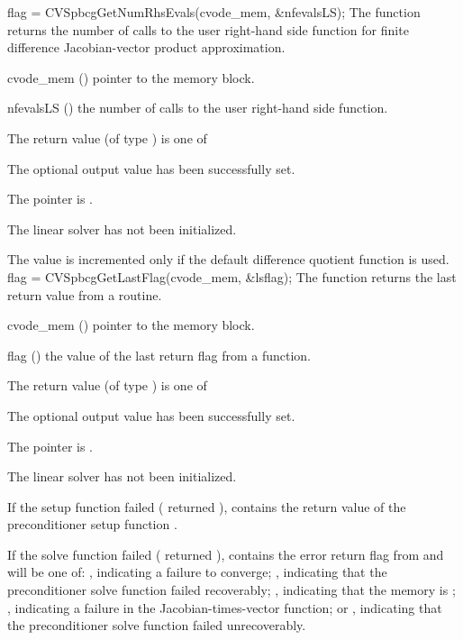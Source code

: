 {}
{
  flag = CVSpbcgGetNumRhsEvals(cvode\_mem, \&nfevalsLS);
}
{
  The function  returns the
  number of calls to the user right-hand side function for
  finite difference Jacobian-vector product approximation.
}
{
  \begin{args}
  \item[cvode\_mem] ()
    pointer to the {\cvodes} memory block.
  \item[nfevalsLS] ()
    the number of calls to the user right-hand side function.
  \end{args}
}
{
  The return value  (of type ) is one of
  \begin{args}
  \item[\Id{CVSPBCG\_SUCCESS}] 
    The optional output value has been successfully set.
  \item[\Id{CVSPBCG\_MEM\_NULL}]
    The  pointer is .
  \item[\Id{CVSPBCG\_LMEM\_NULL}]
    The {\cvspbcg} linear solver has not been initialized.
  \end{args}
}
{
  The value  is incremented only if the default 
   difference quotient function is used.
}
{
  flag = CVSpbcgGetLastFlag(cvode\_mem, \&lsflag);
}
{
  The function  returns the
  last return value from a {\cvspbcg} routine. 
}
{
  \begin{args}
  \item[cvode\_mem] ()
    pointer to the {\cvodes} memory block.
  \item[flag] ()
    the value of the last return flag from a {\cvspbcg} function.
  \end{args}
}
{
  The return value  (of type ) is one of
  \begin{args}
  \item[\Id{CVSPBCG\_SUCCESS}] 
    The optional output value has been successfully set.
  \item[\Id{CVSPBCG\_MEM\_NULL}]
    The  pointer is .
  \item[\Id{CVSPBCG\_LMEM\_NULL}]
    The {\cvspbcg} linear solver has not been initialized.
  \end{args}
}
{
  If the {\cvspbcg} setup function failed ( returned
  ),  contains the return value of the
  preconditioner setup function .

  If the {\cvspbcg} solve function failed ( returned
  ),  contains the error return flag from
   and will be one of:
  , indicating a failure to converge;
  , indicating that the preconditioner solve function
   failed recoverably;
  , indicating that the {\spbcg} memory is ;
  , indicating a failure in the Jacobian-times-vector
  function; or
  , indicating that the preconditioner solve
  function  failed unrecoverably.
}
